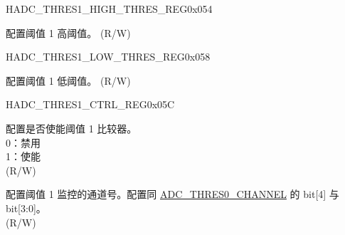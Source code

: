 \begin{register}{H}{ADC\_THRES1\_HIGH\_THRES\_REG}{0x054}\label{regdesc:ADCTHRES1HIGHTHRESREG}
%
%
\regnewline%
\begin{regdesc}\begin{reglist}
\label{fielddesc:ADCTHRES1HIGH}\item [ADC\_THRES1\_HIGH] 配置阈值 1 高阈值。 (R/W)
\end{reglist}\end{regdesc}
\end{register}


\begin{register}{H}{ADC\_THRES1\_LOW\_THRES\_REG}{0x058}\label{regdesc:ADCTHRES1LOWTHRESREG}
%
%
\regnewline%
\begin{regdesc}\begin{reglist}
\label{fielddesc:ADCTHRES1LOW}\item [ADC\_THRES1\_LOW] 配置阈值 1 低阈值。 (R/W)
\end{reglist}\end{regdesc}
\end{register}


\begin{register}{H}{ADC\_THRES1\_CTRL\_REG}{0x05C}\label{regdesc:ADCTHRES1CTRLREG}
%
%
%
\regnewline%
\begin{regdesc}\begin{reglist}
\label{fielddesc:ADCTHRES1EN}\item [ADC\_THRES1\_EN] 配置是否使能阈值 1 比较器。\\
0：禁用\\
1：使能\\
(R/W)
\label{fielddesc:ADCTHRES1CHANNEL}\item [ADC\_THRES1\_CHANNEL] 配置阈值 1 监控的通道号。配置同 \hyperref[fielddesc:ADCTHRES0CHANNEL]{ADC\_THRES0\_CHANNEL} 的 bit[4] 与 bit[3:0]。\\
(R/W)
\end{reglist}\end{regdesc}
\end{register}


